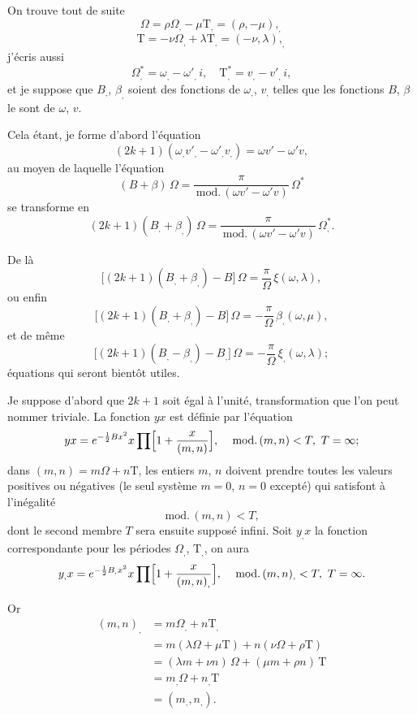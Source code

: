 \documentclass[11pt,a4paper]{article}
\providecommand{\md}{\,\mathrm{mod.}\,}
\begin{document}
\medskip

On trouve tout de suite
\[
\Omega = \rho\Omega_{,} - \mu\mathrm{T}_{,} = (\rho, -\mu),_{,}
\]
\[
\mathrm{T} = -\nu\Omega_{,} + \lambda\mathrm{T}_{,} = (-\nu, \lambda),_{,}
\]
j'\'ecris aussi
\[
\Omega_{,}^{*} = \omega_{,} - \omega'_{,}\,i,\quad \mathrm{T}_{,}^{*} = v_{,} - v'_{,}\,i,
\]
et je suppose que $B_{,}$, $\beta_{,}$ soient des fonctions de $\omega_{,}$, $v_{,}$ telles que les fonctions $B$, $\beta$ le sont de $\omega$, $v$.

\medskip

Cela \'etant, je forme d'abord l'\'equation
\[
(2k+1)(\omega_{,} v'_{,} - \omega'_{,} v_{,}) = \omega v' - \omega' v,
\]
au moyen de laquelle l'\'equation
\[
(B + \beta)\,\Omega = \frac{\pi}{\md(\omega v' - \omega' v)}\,\Omega^*
\]
se transforme en
\[
(2k+1)(B_{,} + \beta_{,})\,\Omega = \frac{\pi}{\md(\omega v' - \omega' v)}\,\Omega_{,}^{*}.
\]

\medskip

De l\`a
\[
\bigl[(2k+1)(B_{,} + \beta_{,}) - B\bigr]\,\Omega = \frac{\pi}{\Omega}\,\xi(\omega, \lambda),
\]
ou enfin
\[
\bigl[(2k+1)(B_{,} + \beta_{,}) - B\bigr]\,\Omega = -\frac{\pi}{\Omega}\,\beta_{,}(\omega, \mu),
\]
et de m\^eme
\[
\bigl[(2k+1)(B_{,} - \beta_{,}) - B_{,}\bigr]\,\Omega = -\frac{\pi}{\Omega}\,\xi_{,}(\omega, \lambda);
\]
\'equations qui seront bient\^ot utiles.

\medskip

Je suppose d'abord que $2k+1$ soit \'egal \`a l'unit\'e, transformation que l'on peut nommer triviale. La fonction $yx$ est d\'efinie par l'\'equation
\[
yx = e^{-\frac{1}{2}Bx^2} x \prod \Bigl[1 + \frac{x}{(m, n)}\Bigr],\quad \md(m, n) < T,\ T = \infty;
\]
dans $(m, n) = m\Omega + n\mathrm{T}$, les entiers $m$, $n$ doivent prendre toutes les valeurs positives ou n\'egatives (le seul syst\`eme $m = 0$, $n = 0$ except\'e) qui satisfont \`a l'in\'egalit\'e
\[ \md(m, n) < T, \]
dont le second membre $T$ sera ensuite suppos\'e infini. Soit $y_{,} x$ la fonction correspondante pour les p\'eriodes $\Omega_{,}$, $\mathrm{T}_{,}$, on aura
\[
y_{,} x = e^{-\frac{1}{2} B_{,} x^2} x \prod \Bigl[1 + \frac{x}{(m, n)_{,}}\Bigr],\quad \md(m, n)_{,} < T,\ T = \infty.
\]

\medskip

\noindent Or
\begin{align*}
(m, n)_{,} &= m\Omega_{,} + n\mathrm{T}_{,}\\
&= m(\lambda\Omega + \mu\mathrm{T}) + n(\nu\Omega + \rho\mathrm{T})\\
&= (\lambda m + \nu n)\,\Omega + (\mu m + \rho n)\,\mathrm{T}\\
&= m_{,}\Omega + n_{,}\mathrm{T}\\
&= (m_{,}, n_{,}).
\end{align*}
\end{document}
